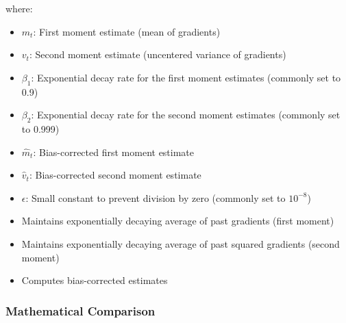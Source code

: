 \documentclass[
  letterpaper,
  DIV=11,
  numbers=noendperiod]{scrreprt}
\providecommand{\tightlist}{%
  \setlength{\itemsep}{0pt}\setlength{\parskip}{0pt}}
\begin{document}
where:

\begin{itemize}
\tightlist
\item
  \(m_t\): First moment estimate (mean of gradients)
\item
  \(v_t\): Second moment estimate (uncentered variance of gradients)
\item
  \(\beta_1\): Exponential decay rate for the first moment estimates
  (commonly set to 0.9)
\item
  \(\beta_2\): Exponential decay rate for the second moment estimates
  (commonly set to 0.999)
\item
  \(\hat{m}_t\): Bias-corrected first moment estimate
\item
  \(\hat{v}_t\): Bias-corrected second moment estimate
\item
  \(\epsilon\): Small constant to prevent division by zero (commonly set
  to \(10^{-8}\))
\end{itemize}

\begin{tcolorbox}[enhanced jigsaw, leftrule=.75mm, rightrule=.15mm, colback=white, colbacktitle=quarto-callout-note-color!10!white, arc=.35mm, opacityback=0, toptitle=1mm, bottomrule=.15mm, bottomtitle=1mm, titlerule=0mm, title=\textcolor{quarto-callout-note-color}{\faInfo}\hspace{0.5em}{Advantages of Adam:}, toprule=.15mm, left=2mm, coltitle=black, breakable, colframe=quarto-callout-note-color-frame, opacitybacktitle=0.6]

\begin{itemize}
\tightlist
\item
  Maintains exponentially decaying average of past gradients (first
  moment)
\item
  Maintains exponentially decaying average of past squared gradients
  (second moment)
\item
  Computes bias-corrected estimates
\end{itemize}

\end{tcolorbox}

\subsubsection{Mathematical Comparison}\label{mathematical-comparison}
\end{document}
